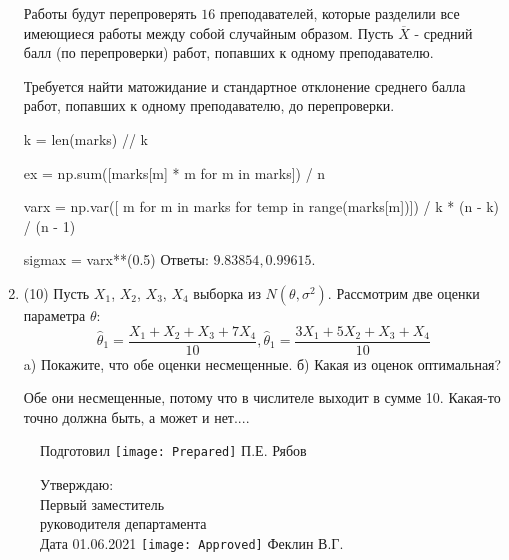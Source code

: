 \documentclass[a4paper,14pt]{article}
\begin{document}
\begin{enumerate}
	Работы будут перепроверять $16$ преподавателей, которые разделили все имеющиеся работы между собой случайным образом. Пусть $\overline{X}$ - средний балл (по перепроверки) работ, попавших к одному преподавателю.

	Требуется найти матожидание и стандартное отклонение среднего балла работ, попавших к одному преподавателю, до перепроверки.
    


    


    k = len(marks) // k

    ex = np.sum([marks[m] * m for m in marks]) / n

    varx = np.var([ m for m in marks for temp in range(marks[m])]) / k * (n - k) / (n - 1)

    sigmax = varx**(0.5)
    Ответы: $9.83854, 0.99615$.

    

\item


(10) Пусть $X _{1}$, $X _{2}$, $X _{3}$, $X _{4}$ выборка из $N(\theta, \sigma ^{2})$. Рассмотрим две оценки параметра $\theta$:
\[\hat \theta _{1} = \frac{X _{1} + X _{2} + X _{3} + 7X _{4}}{10}, \hat \theta _{1} = \frac{3X _{1} + 5X _{2} + X _{3} + X _{4}}{10}\]
a) Покажите, что обе оценки несмещенные.
б) Какая из оценок оптимальная?




Обе они несмещенные, потому что в числителе выходит в сумме 10.
Какая-то точно должна быть, а может и нет....


\end{enumerate}

\begin{figure}[H]
	Подготовил
	\hfill
	\texttt{[image: Prepared]}
	П.Е. Рябов
\end{figure}


\begin{figure}[H]
	Утверждаю:\\
	Первый заместитель\\
	руководителя департамента\\
	Дата 01.06.2021
	\hfill
	\texttt{[image: Approved]}
	Феклин В.Г.
\end{figure}
\end{document}

